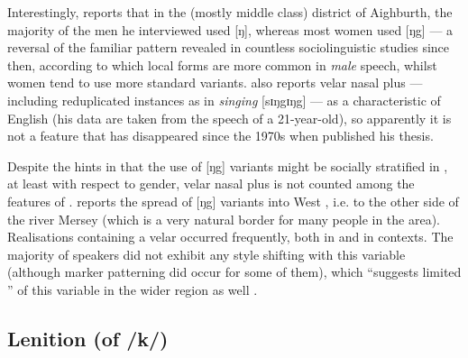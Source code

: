 Interestingly, \citeauthor{knowles1973} reports that in the (mostly middle class) district of Aighburth, the majority of the men he interviewed used [ŋ], whereas most women used [ŋg] \citeyearpar[cf.][295]{knowles1973} --- a reversal of the familiar pattern revealed in countless sociolinguistic studies since then, according to which local forms are more common in \emph{male} speech, whilst women tend to use more standard variants.
\citet[352]{watson2007} also reports velar nasal plus --- including reduplicated instances as in \emph{singing} [sɪŋgɪŋg] --- as a characteristic of  English (his data are taken from the speech of a 21-year-old), so apparently it is not a feature that has disappeared since the 1970s when \citeauthor{knowles1973} published his thesis.

Despite the hints in \textcite{knowles1973} that the use of [ŋg] variants might be socially stratified in , at least with respect to gender, velar nasal plus is not counted among the  features of .
\textcite[98]{newbrook1999} reports the spread of [ŋg] variants into West , i.e. to the other side of the river Mersey (which is a very  natural border for many people in the area).
Realisations containing a velar  occurred frequently, both in  and in  contexts.
The majority of speakers did not exhibit any style shifting with this variable (although marker patterning did occur for some of them), which ``suggests limited '' of this variable in the wider  region as well \parencite[98]{newbrook1999}.

		\subsection{Lenition (of /k/)}\label{sec.var.con.len}

